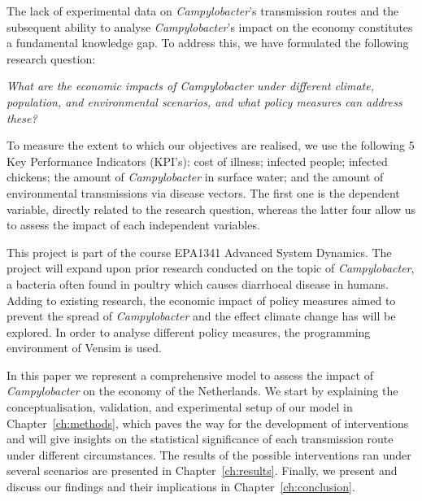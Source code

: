 The lack of experimental data on \textit{Campylobacter}’s transmission routes and the subsequent ability to analyse \textit{Campylobacter}’s impact on the economy constitutes a fundamental knowledge gap. To address this, we have formulated the following research question:
\begin{center}\textit{\textcolor{NiceBlue}{
What are the economic impacts of Campylobacter under different climate, population, and environmental scenarios, and what policy measures can address these? 
}}
\end{center}
To measure the extent to which our objectives are realised, we use the following 5 Key Performance Indicators (KPI’s): cost of illness; infected people; infected chickens; the amount of \textit{Campylobacter} in surface water; and the amount of environmental transmissions via disease vectors. The first one is the dependent variable, directly related to the research question, whereas the latter four allow us to assess the impact of each independent variables.

This project is part of the course EPA1341 Advanced System Dynamics. The project will expand upon prior research conducted on the topic of \textit{Campylobacter}, a bacteria often found in poultry which causes diarrhoeal disease in humans. Adding to existing research, the economic impact of policy measures aimed to prevent the spread of  \textit{Campylobacter} and the effect climate change has will be explored. In order to analyse different policy measures, the programming environment of Vensim is used. 

In this paper we represent a comprehensive model to assess the impact of \textit{Campylobacter} on the economy of the Netherlands. We start by explaining the conceptualisation, validation, and experimental setup of our model in Chapter~\ref{ch:methods}, which paves the way for the development of interventions and will give insights on the statistical significance of each transmission route under different circumstances. The results of the possible interventions ran under several scenarios are presented in Chapter~\ref{ch:results}. Finally, we present and discuss our findings and their implications in Chapter~\ref{ch:conclusion}.